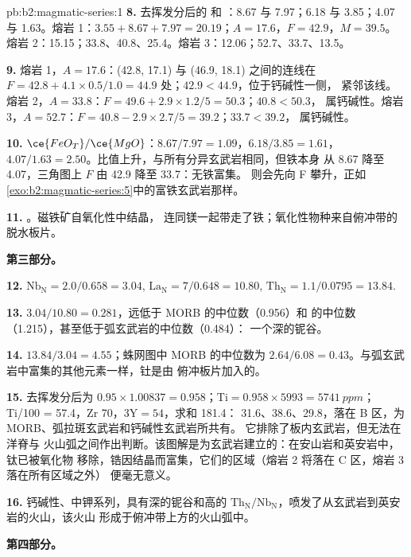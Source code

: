\begin{solution}{pb:b2:magmatic-series:1}
\textbf{8.} 去挥发分后的  和 ：8.67 与 7.97；6.18 与 3.85；4.07
与 1.63。熔岩 1：$3.55 + 8.67 + 7.97 = 20.19$；$A = 17.6$，$F = 42.9$，$M = 39.5$。
熔岩 2：15.15；33.8、40.8、25.4。熔岩 3：12.06；52.7、33.7、13.5。

\textbf{9.} 熔岩 1，$A = 17.6$：(42.8, 17.1) 与 (46.9, 18.1) 之间的连线在
$F = 42.8 + 4.1\times0.5/1.0 = 44.9$ 处；$42.9 < 44.9$，位于钙碱性一侧，
紧邻该线。熔岩 2，$A = 33.8$：$F = 49.6 + 2.9\times1.2/5 = 50.3$；$40.8 < 50.3$，
属钙碱性。熔岩 3，$A = 52.7$：$F = 40.8 - 2.9\times2.7/5 = 39.2$；$33.7 < 39.2$，
属钙碱性。

\textbf{10.} $\ce{FeO_T}/\ce{MgO}$：$8.67/7.97 = 1.09$，$6.18/3.85 = 1.61$，$4.07/1.63 =
2.50$。比值上升，与所有分异玄武岩相同，但铁本身
从 8.67 降至 4.07，三角图上 $F$ 由 42.9 降至 33.7：无铁富集。
则会先向 F 攀升，正如
\cref{exo:b2:magmatic-series:5}中的富铁玄武岩那样。

\textbf{11.} 。磁铁矿自氧化性中结晶，
连同镁一起带走了铁；氧化性物种来自俯冲带的
脱水板片。

\noindent\textbf{第三部分。}

\textbf{12.} $\mathrm{Nb_N} = 2.0/0.658 = 3.04$, $\mathrm{La_N} = 7/0.648 = 10.80$,
$\mathrm{Th_N} = 1.1/0.0795 = 13.84$.

\textbf{13.} $3.04/10.80 = 0.281$，远低于 MORB 的中位数（0.956）和
的中位数（1.215），甚至低于弧玄武岩的中位数（0.484）：
一个深的铌谷。

\textbf{14.} $13.84/3.04 = 4.55$；蛛网图中 MORB 的中位数为 $2.64/6.08 =
0.43$。与弧玄武岩中富集的其他元素一样，钍是由
俯冲板片加入的。

\textbf{15.}  去挥发分后为 $0.95\times1.00837 = 0.958$；$\mathrm{Ti} =
0.958\times5993 = \qty{5741}{ppm}$；Ti/100 = 57.4，Zr 70，$3\mathrm Y = 54$，求和 181.4：
31.6、38.6、29.8，落在 B 区，为 MORB、弧拉斑玄武岩和钙碱性玄武岩所共有。
它排除了板内玄武岩，但无法在洋脊与
火山弧之间作出判断。该图解是为玄武岩建立的：在安山岩和英安岩中，钛已被氧化物
移除，锆因结晶而富集，它们的区域（熔岩 2 将落在 C 区，熔岩 3 落在所有区域之外）
便毫无意义。

\textbf{16.} 钙碱性、中钾系列，具有深的铌谷和高的
$\mathrm{Th_N}/\mathrm{Nb_N}$，喷发了从玄武岩到英安岩的火山，该火山
形成于俯冲带上方的火山弧中。

\noindent\textbf{第四部分。}


\end{solution}
